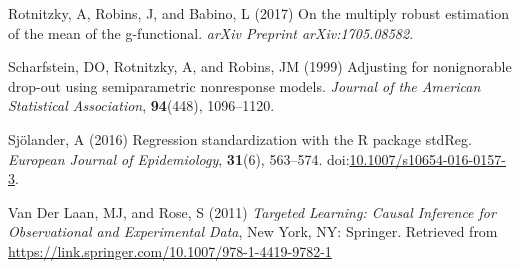\documentclass[
  singlecolumn]{article}
\newlength{\cslhangindent}
\newenvironment{CSLReferences}[2] %
 {\begin{list}{}{%
  \setlength{\itemindent}{0pt}
  \setlength{\leftmargin}{0pt}
  \setlength{\parsep}{0pt}
  \ifodd #1
   \setlength{\leftmargin}{\cslhangindent}
   \setlength{\itemindent}{-1\cslhangindent}
  \fi
  \setlength{\itemsep}{#2\baselineskip}}}
 {\end{list}}
\begin{document}
\begin{CSLReferences}{1}{0}
Rotnitzky, A, Robins, J, and Babino, L (2017) On the multiply robust
estimation of the mean of the g-functional. \emph{arXiv Preprint
arXiv:1705.08582}.

Scharfstein, DO, Rotnitzky, A, and Robins, JM (1999) Adjusting for
nonignorable drop-out using semiparametric nonresponse models.
\emph{Journal of the American Statistical Association},
\textbf{94}(448), 1096--1120.

Sjölander, A (2016) Regression standardization with the R package
stdReg. \emph{European Journal of Epidemiology}, \textbf{31}(6),
563--574.
doi:\href{https://doi.org/10.1007/s10654-016-0157-3}{10.1007/s10654-016-0157-3}.

Van Der Laan, MJ, and Rose, S (2011) \emph{Targeted Learning: Causal
Inference for Observational and Experimental Data}, New York, NY:
Springer. Retrieved from
\url{https://link.springer.com/10.1007/978-1-4419-9782-1}

\end{CSLReferences}
\end{document}
